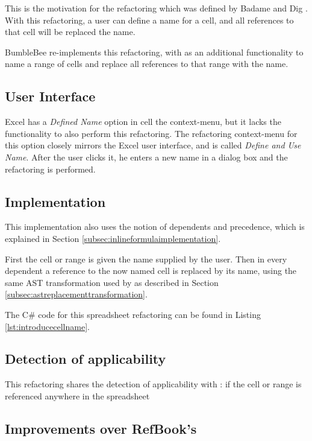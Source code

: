 This is the motivation for the  refactoring which was defined by Badame and Dig \cite{badame2012refactoring}.
With this refactoring, a user can define a name for a cell, and all references to that cell will be replaced the name.

BumbleBee re-implements this refactoring, with as an additional functionality to name a range of cells and replace all references to that range with the name.

\subsection{User Interface}

Excel has a \emph{Defined Name} option in cell the context-menu, but it lacks the functionality to also perform this refactoring.
The refactoring context-menu for this option closely mirrors the Excel user interface, and is called \emph{Define and Use Name}.
After the user clicks it, he enters a new name in a dialog box and the refactoring is performed.

\subsection{Implementation}

This implementation also uses the notion of dependents and precedence, which is explained in Section \ref{subsec:inlineformulaimplementation}.

First the cell or range is given the name supplied by the user.
Then in every dependent a reference to the now named cell is replaced by its name, using the same AST transformation used by  as described in Section \ref{subsec:astreplacementtransformation}.

The C\# code for this spreadsheet refactoring can be found in Listing \ref{lst:introducecellname}.

\subsection{Detection of applicability}

This refactoring shares the detection of applicability with : if the cell or range is referenced anywhere in the spreadsheet 

\subsection{Improvements over RefBook's }

